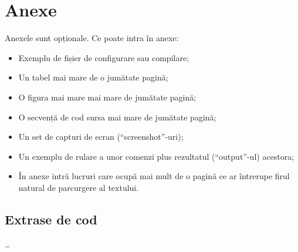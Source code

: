 \documentclass[12pt,a4paper]{report}
\begin{document}


\chapter*{Anexe}

Anexele sunt opționale.
Ce poate intra în anexe:
\begin{itemize}
\item	Exemplu de fișier de configurare sau compilare;
\item	Un tabel mai mare de o jumătate pagină;
\item	O figura mai mare mai mare de jumătate pagină;
\item	O secvență de cod sursa mai mare de jumătate pagină;
\item	Un set de capturi de ecran (``screenshot''-uri);
\item	Un exemplu de rulare a unor comenzi plus rezultatul (``output''-ul) acestora;
\item 	În anexe intră lucruri care ocupă mai mult de o pagină ce ar întrerupe firul natural de parcurgere al textului.
\end{itemize}

\begin{appendices}

\chapter{Extrase de cod} %
\ldots


\end{appendices}
\end{document}

